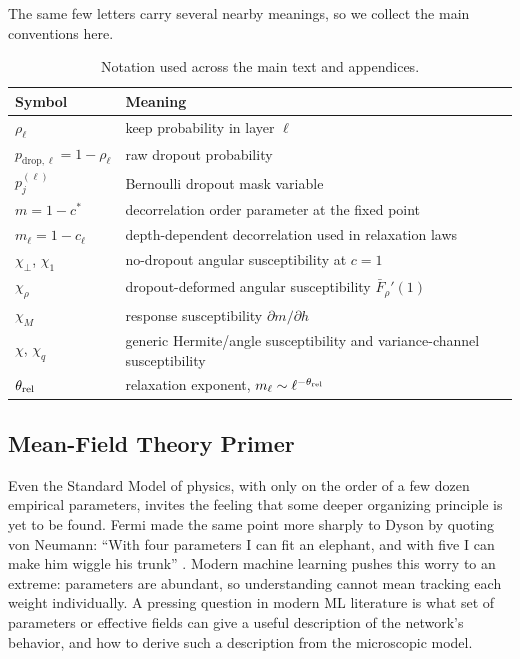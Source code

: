 \documentclass{article}
\theoremstyle{plain}
\theoremstyle{definition}
\theoremstyle{remark}
\begin{document}
The same few letters carry several nearby meanings, so we collect the main conventions here.
\begin{table}[h]
\caption{Notation used across the main text and appendices.}
\label{tab:notation_guide}
\centering
\small
\begin{tabular}{@{}ll@{}}
\toprule
Symbol & Meaning \\
\midrule
\(\rho_\ell\) & keep probability in layer \(\ell\) \\
\(p_{\mathrm{drop},\ell}=1-\rho_\ell\) & raw dropout probability \\
\(p_j^{(\ell)}\) & Bernoulli dropout mask variable \\
\(m=1-c^\ast\) & decorrelation order parameter at the fixed point \\
\(m_\ell=1-c_\ell\) & depth-dependent decorrelation used in relaxation laws \\
\(\chi_\perp\), \(\chi_1\) & no-dropout angular susceptibility at \(c=1\) \\
\(\chi_\rho\) & dropout-deformed angular susceptibility \(\bar F_\rho'(1)\) \\
\(\chi_M\) & response susceptibility \(\partial m/\partial h\) \\
\(\chi\), \(\chi_q\) & generic Hermite/angle susceptibility and variance-channel susceptibility \\
\(\theta_{\rm rel}\) & relaxation exponent, \(m_\ell\sim \ell^{-\theta_{\rm rel}}\) \\
\bottomrule
\end{tabular}
\end{table}
\FloatBarrier










\subsection{Mean-Field Theory Primer}
\label{app:mft_primer}

Even the Standard Model of physics, with only on the order of a few dozen empirical parameters, invites the feeling that some deeper organizing principle is yet to be found. Fermi made the same point more sharply to Dyson by quoting von Neumann: ``With four parameters I can fit an elephant, and with five I can make him wiggle his trunk'' \cite{Dyson2004Fermi}. Modern machine learning pushes this worry to an extreme: parameters are abundant, so understanding cannot mean tracking each weight individually. A pressing question in modern ML literature is what set of parameters or effective fields can give a useful description of the network's behavior, and how to derive such a description from the microscopic model.
\end{document}
